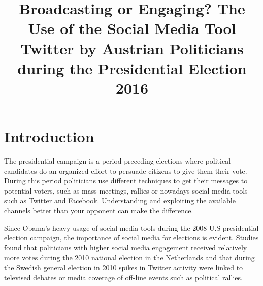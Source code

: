 \documentclass{llncs}
\begin{document}
%
\frontmatter          %
\mainmatter              %
%
\title{Broadcasting or Engaging? The Use of the Social Media Tool Twitter by Austrian
	Politicians during the Presidential Election 2016}
%
%
%
%
%

\maketitle              %

%
%
\section{Introduction}
%
The presidential campaign is a period preceding elections where political candidates do an organized effort to persuade citizens to give them their vote. During this period politicians use different techniques to get their messages to potential voters, such as mass meetings, rallies or nowadays social media tools such as Twitter and Facebook. Understanding and exploiting the available channels better than your opponent can make the difference. 

Since Obama's heavy usage of social media tools during the 2008 U.S presidential election campaign\cite{aaker2010obama}, the importance of social media for elections is evident. Studies found that politicians with higher social media engagement received relatively more votes during the 2010 national election in the Netherlands\cite{effing2011social} and that during the Swedish general election in 2010 spikes in Twitter activity were linked to televised debates or media coverage of off-line events such as political rallies\cite{larsson2012studying}.
\end{document}
